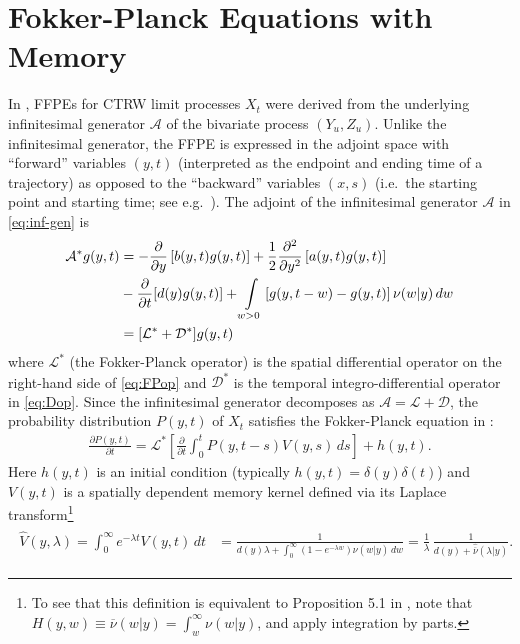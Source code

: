 \documentclass[a4paper,12pt]{elsarticle}
\numberwithin{equation}{section}
\theoremstyle{plain}
\theoremstyle{definition}
\theoremstyle{remark}
\numberwithin{equation}{section}
\newcommand{\1}{\mathbf 1}
\newcommand{\del}{\partial}
\begin{document}
\section{Fokker-Planck Equations with Memory}
\label{sec:FFPE}

In \cite{BaeumerStraka16}, FFPEs for CTRW limit processes $X_t$ were derived
from the underlying infinitesimal generator $\mathcal A$ of the bivariate
process $(Y_u, Z_u)$.
Unlike the infinitesimal generator, the FFPE is expressed in the adjoint
space with ``forward'' variables $(y,t)$ (interpreted as the endpoint and
ending time of a trajectory) as opposed to the ``backward'' variables $(x,s)$
(i.e.\ the starting point and starting time; see e.g.\ 
\cite[Section 3.5.3]{Applebaum}).
The adjoint of the infinitesimal generator $\mathcal A$ in \eqref{eq:inf-gen}
is
\begin{align}
\label{eq:FPop}
\mathcal A^* g(y,t)
&= -\frac{\partial }{\partial y}\left[b(y,t) g(y,t)\right]
+\frac{1}{2}\frac{\partial^2 }{\partial y^2}\left[a(y,t) g(y,t)\right]
\\
\label{eq:Dop}
&-\frac{\partial }{\partial t}[d(y) g(y,t)]
+ \int\limits_{w > 0} \left[g(y, t-w)-g(y, t)
\right] \nu(w | y) \, dw
\\ \notag
&= [\mathcal L^* + \mathcal D^*] g(y,t)
\end{align}
where $\mathcal L^*$ (the Fokker-Planck operator) is the spatial differential
operator on the right-hand side of \eqref{eq:FPop} and $\mathcal D^*$ is the
temporal integro-differential operator in \eqref{eq:Dop}.
Since the infinitesimal generator decomposes as
$\mathcal A = \mathcal L + \mathcal D$, the probability distribution $P(y,t)$
of $X_t$ satisfies the Fokker-Planck equation in \cite[(5.2)]{BaeumerStraka16}:
\begin{align} \label{eq:FFPE}
\frac{\del P(y,t)}{\del t} = \mathcal L^* \left[ \frac{\partial}{\partial t}
\int_0^t P(y,t-s) V(y,s)\,ds \right] + h(y,t).
\end{align}
Here $h(y,t)$ is an initial condition (typically $h(y,t) = \delta(y) \delta(t)$)
and $V(y,t)$ is a spatially dependent memory kernel defined via its Laplace
transform\footnote{To see that this definition is equivalent to Proposition 5.1
in \cite{BaeumerStraka16}, note that $H(y,w) \equiv \overline \nu(w|y) = \int_w^\infty \nu(w|y)$,
and apply integration by parts.}
\begin{align} \label{eq:LT-renewal-measure}
\begin{split}
\hat V(y,\lambda) = \int_0^\infty e^{-\lambda t} V(y,t)\,dt
&= \frac{1}{d(y)\lambda + \int_0^\infty (1-e^{-\lambda w})
\nu(w | y)\,dw}
= \frac{1}{\lambda} \, \frac{1}{d(y) + \hat{\overline{\nu}}(\lambda|y)}.
\end{split}
\end{align}
\end{document}
